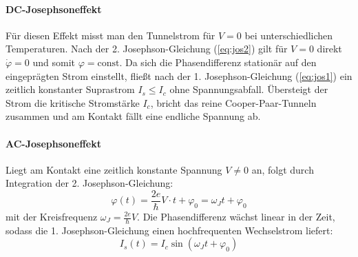 \paragraph{DC-Josephsoneffekt}
Für diesen Effekt misst man den Tunnelstrom für $V=0$ bei unterschiedlichen Temperaturen. Nach der 2. Josephson-Gleichung (\cref{eq:jos2}) gilt für $V=0$ direkt $\dot{\varphi} = 0$ und somit $\varphi = \text{const.}$ Da sich die Phasendifferenz stationär auf den eingeprägten Strom einstellt, fließt nach der 1. Josephson-Gleichung (\cref{eq:jos1}) ein zeitlich konstanter Suprastrom $I_s \le I_c$ ohne Spannungsabfall. Übersteigt der Strom die kritische Stromstärke $I_c$, bricht das reine Cooper-Paar-Tunneln zusammen und am Kontakt fällt eine endliche Spannung ab.

\paragraph{AC-Josephsoneffekt}
Liegt am Kontakt eine zeitlich konstante Spannung $V \neq 0$ an, folgt durch Integration der 2. Josephson-Gleichung:
\begin{equation}
    \varphi(t) = \frac{2e}{\hbar} V \cdot t + \varphi_0 = \omega_J t + \varphi_0
\end{equation}
mit der Kreisfrequenz $\omega_J = \frac{2e}{\hbar} V$. Die Phasendifferenz wächst linear in der Zeit, sodass die 1. Josephson-Gleichung einen hochfrequenten Wechselstrom liefert:
\begin{equation}
    I_s(t) = I_c \sin(\omega_J t + \varphi_0)
\end{equation}

